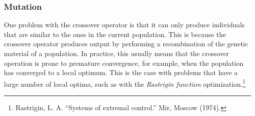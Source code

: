 \subsubsection{Mutation}
\label{sec:genetic_algorithms:variation:mutation}
  One problem with the crossover operator is that it can only produce individuals that are similar
  to the ones in the current population.
  This is because the crossover operator produces output by performing a recombination of the
  genetic material of a population.
  In practice, this usually means that the crossover operation is prone to premature convergence,
  for example, when the population has converged to a local optimum.
  This is the case with problems that have a large number of local optima, such as with the
  \emph{Rastrigin function} optimization.\footnote{
    Rastrigin, L. A. \enquote{Systems of extremal control.} Mir, Moscow (1974).
  }

%